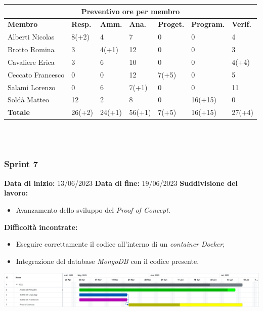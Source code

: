 \documentclass[a4paper, 12pt]{article}
\begin{document}
\begin{center}
	\begin{tabularx}{\textwidth}{|X|X|X|X|X|X|X|}
		\hline
		\multicolumn{7}{|c|}{\textbf{Preventivo ore per membro}}                                      \\
		\hline
		\hline
		\textbf{Membro}  & \textbf{Resp.} & \textbf{Amm.} & \textbf{Ana.} &
		\textbf{Proget.} & \textbf{Program.} & \textbf{Verif.} \\
		\hline
		Alberti Nicolas    	&8(+2) 	&4	&7	&0	&0	&4	\\
		\hline
		Brotto Romina    	&3 	&4(+1)	&12	&0	&0	&3	\\
		\hline
		Cavaliere Erica    	&3 	&6  &10  &0 &0 &4(+4)	\\
		\hline
		Ceccato Francesco   &0 	&0  &12  &7(+5) &0 &5	\\
		\hline
		Salami Lorenzo    	&0 	&6  &7(+1) &0 &0 &11	\\
		\hline
		Soldà Matteo    	&12	&2  &8 &0 &16(+15) &0	\\
		\hline
		\hline
		\textbf{Totale} 	&26(+2) &24(+1) &56(+1) &7(+5) &16(+15) &27(+4)	\\
		\hline
	\end{tabularx}\\[8pt]
	\mbox{}\\
\end{center}

\newpage

\subsubsection{Sprint 7}
\textbf{Data di inizio:} 13/06/2023\newline
\textbf{Data di fine:} 19/06/2023\newline
\newline
\textbf{Suddivisione del lavoro:}
\begin{itemize}
    \item Avanzamento dello sviluppo del \textit{Proof of Concept}.
\end{itemize}
\textbf{Difficoltà incontrate:}
\begin{itemize}
    \item Eseguire correttamente il codice all'interno di un \textit{container Docker};
    \item Integrazione del database \textit{MongoDB} con il codice presente.
\end{itemize}
\includegraphics[scale=0.24]{RTB_6.png}\newline
\newline
\end{document}
